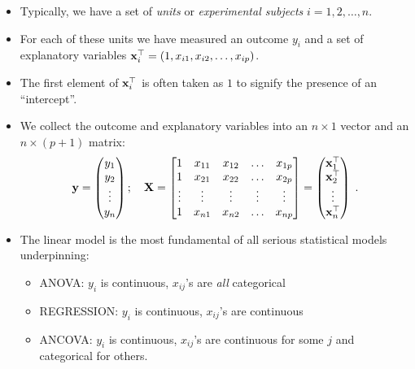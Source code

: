 \begin{frame}
 
\begin{itemize}\setlength{\itemsep}{0.4cm}
 \item Typically, we have a set of \emph{units} or \emph{experimental subjects} $i=1,2,\ldots,n$.

 \item For each of these units we have measured an outcome $y_i$ and a set of explanatory variables $\textbf{x}_i^{\top} = (1, x_{i1}, x_{i2}, \ldots, x_{ip})$. 

 \item The first element of $\textbf{x}_i^{\top}$ is often taken as $1$ to signify the presence of an ``intercept''. 
 
 \item We collect the outcome and explanatory variables into an $n\times 1$ vector and an $n\times (p+1)$ matrix:
\begin{align*}
 \textbf{y} = \begin{pmatrix} 
	y_1 \\
        y_2 \\
	\vdots \\
	y_n
       \end{pmatrix};\quad \textbf{X} = \begin{bmatrix}
			1 & x_{11} & x_{12} & \ldots & x_{1p} \\
			1 & x_{21} & x_{22} & \ldots & x_{2p} \\
			\vdots & \vdots & \vdots & \vdots & \vdots \\
			1 & x_{n1} & x_{n2} & \ldots & x_{np}
                       \end{bmatrix} = \begin{pmatrix} 
	\textbf{x}_1^{\top} \\
        \textbf{x}_2^{\top} \\
	\vdots \\
	\textbf{x}_n^{\top}
       \end{pmatrix}\; . 
\end{align*}

\end{itemize}

\end{frame}

\begin{frame}

\begin{itemize}
 \item The linear model is the most fundamental of all serious statistical models underpinning:
\vspace*{0.5cm}
	\begin{itemize}\setlength{\itemsep}{0.4cm}
	\item ANOVA: $y_i$ is continuous, $x_{ij}$'s are \emph{all} categorical
	\item REGRESSION: $y_i$ is continuous, $x_{ij}$'s are continuous
	\item ANCOVA: $y_i$ is continuous, $x_{ij}$'s are continuous for some $j$ and categorical for others. 
	\end{itemize}
\end{itemize} 
\end{frame}

